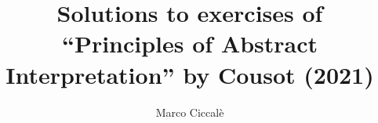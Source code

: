 \documentclass[10pt,justified,nofonts]{tufte-handout}
\title{Solutions to exercises of ``Principles of Abstract Interpretation'' by Cousot (2021)}
\author{Marco Ciccal{\`{e}}}
\begin{document}
%
\maketitle
%
\tableofcontents

{}



\end{document}
